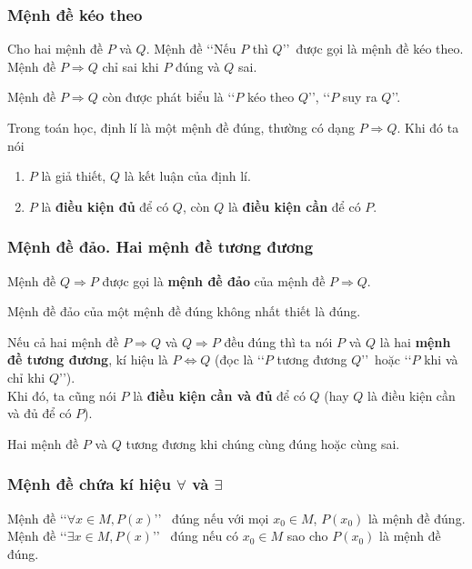 \subsubsection{Mệnh đề kéo theo}
\begin{khung4}{}
	Cho hai mệnh đề $P$ và $Q$. Mệnh đề \lq\lq Nếu $P$ thì $Q$\rq\rq\ được gọi là mệnh đề kéo theo.\\
	Mệnh đề $P\Rightarrow Q$ chỉ sai khi $P$ đúng và $Q$ sai.
\end{khung4}
\begin{nx}
	 Mệnh đề $P\Rightarrow Q$ còn được phát biểu là \lq\lq $P$ kéo theo $Q$\rq\rq, \lq\lq $P$ suy ra $Q$\rq\rq.
\end{nx}
\begin{note}
	Trong toán học, định lí là một mệnh đề đúng, thường có dạng $P\Rightarrow Q$.
	Khi đó ta nói
	\begin{enumerate}[•]
		\item $P$ là giả thiết, $Q$ là kết luận của định lí.
		\item $P$ là \textbf{điều kiện đủ}  để có $Q$, còn $Q$ là  \textbf{điều kiện cần}  để có $P$.
	\end{enumerate}
\end{note}
\subsubsection{Mệnh đề đảo. Hai mệnh đề tương đương}
\begin{khung4}{}
	Mệnh đề $Q\Rightarrow P$ được gọi là \textbf{mệnh đề đảo} của mệnh đề $P\Rightarrow Q$.
\end{khung4}
\begin{note}
	Mệnh đề đảo của một mệnh đề đúng không nhất thiết là đúng.
\end{note}
\begin{khung4}{}
	Nếu cả hai mệnh đề $P \Rightarrow Q$ và $Q \Rightarrow P$ đều đúng thì ta nói $P$ và $Q$ là hai \textbf{mệnh đề tương đương}, kí hiệu là $P \Leftrightarrow Q$ (đọc là \lq\lq $P$ tương đương $Q$\rq\rq~hoặc \lq\lq $P$ khi và chỉ khi $Q$\rq\rq).\\
	Khi đó, ta cũng nói $P$ là \textbf{điều kiện cần và đủ} để có $Q$ (hay $Q$ là điều kiện cần và đủ để có $P$).
\end{khung4}
\begin{nx}
	Hai mệnh đề $P$ và $Q$ tương đương khi chúng cùng đúng hoặc cùng sai.
\end{nx}

\subsubsection{Mệnh đề chứa kí hiệu $\forall$ và $\exists$}
\begin{khung4}{}
	Mệnh đề \lq\lq $\forall x\in M, P(x)$\rq\rq~ đúng nếu với mọi $x_0\in M$, $P\left(x_0\right)$ là mệnh đề đúng.\\
	Mệnh đề \lq\lq $\exists x\in M, P(x)$\rq\rq~ đúng nếu có $x_0\in M$ sao cho $P\left(x_0\right)$ là mệnh đề đúng.
\end{khung4}
